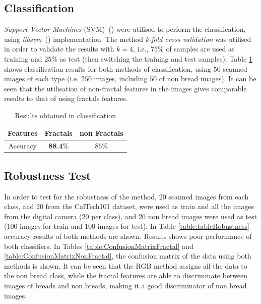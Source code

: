 \documentclass[oneside,a4paper,english,links]{amca}
\begin{document}
\subsection{Classification}
{\em Support Vector Machines} (SVM)~(\cite{Boser92}) were utilised to perform the classification, using {\em libsvm}~(\cite{Chang2011}) implementation.
The method {\em k-fold cross validation} was utilised in order to validate the results with $k = 4$, i.e., $75\%$ of samples are used as training and $25\%$ as test (then switching the training and test samples). Table \ref{table:tableFirstTest} shows classification results for both methods of classification, using $50$ scanned images of each type (i.e. $250$ images, including $50$ of non bread images). It can be seen that the utilisation of non-fractal features in the images gives comparable results to that of using fractals features.

\begin{table}[htb]
\centering
\begin{tabular}{|c|c|c|}
    \hline
    Features & Fractals & non Fractals\\
    \hline
    \hline
    Accuracy  & $\textbf{88.4}\%$ & $86\%$\\
    \hline
\end{tabular}
\caption{Results obtained in classification}
\label{table:tableFirstTest}
\end{table}

\subsection{Robustness Test}
In order to test for the robustness of the method, $20$ scanned images from each class, and $20$ from the CalTech101 dataset, were used as train and all the images from the digital camera ($20$ per class), and $20$ non bread images were used as test ($100$ images for train and $100$ images for test). In Table \ref{table:tableRobustness} accuracy results of both methods are shown. Results shows poor performance of both classifiers. In Tables \ref{table:ConfusionMatrixFractal} and \ref{table:ConfusionMatrixNonFractal}, the confusion matrix of the data using both methods is shown. It can be seen that the RGB method assigns all the data to the non bread class, while the fractal features are able to discriminate between images of breads and non breads, making it a good discriminator of non bread images.
\end{document}
